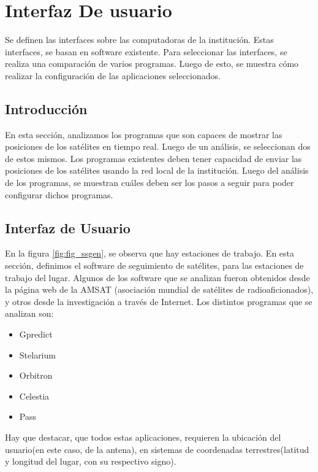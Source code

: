 \graphicspath{{parte_2/Interfaz de usuario}}

\renewcommand{\chaptername}{interfaz de usuario}

\chapter{Interfaz De usuario} %
\begin{center}
	\begin{tcolorbox}[colback=gray!5!white, %
		colframe=blue!75!black,
		title= \center{\Large{Resumen}} ]
		Se definen las interfaces sobre las computadoras de la institución. Estas interfaces, se basan en software existente. Para seleccionar las interfaces, se realiza una comparación de varios programas. Luego de esto, se muestra cómo realizar la configuración de las aplicaciones seleccionados.   
	\end{tcolorbox}
\end{center}    



\section{Introducción}
En esta sección, analizamos los programas que son capaces de mostrar las posiciones de los satélites en tiempo real. Luego de un análisis, se seleccionan dos de estos mismos. Los programas existentes deben tener capacidad de enviar las posiciones de los satélites usando la red local de la institución. Luego del análisis de los programas, se muestran cuáles deben ser los pasos a seguir para poder configurar dichos programas.  

\section{Interfaz de Usuario}

En la figura \ref{fig:fig_ssgen}, se observa que hay estaciones de trabajo. En esta sección, definimos el software de seguimiento de satélites, para las estaciones de trabajo del lugar. Algunos de los software que se analizan fueron obtenidos desde la página web de la AMSAT (asociación mundial de satélites de radioaficionados), y otros desde la investigación a través de Internet. 
Los distintos programas que se analizan son: 
\begin{itemize}
	\item Gpredict 
	\item Stelarium 
	\item Orbitron 
	\item Celestia 
	\item Pass 
\end{itemize}
Hay que destacar, que todos estas aplicaciones, requieren la ubicación del usuario(en este caso, de la antena), en sistemas de coordenadas terrestres(latitud y longitud del lugar, con su respectivo signo). 


